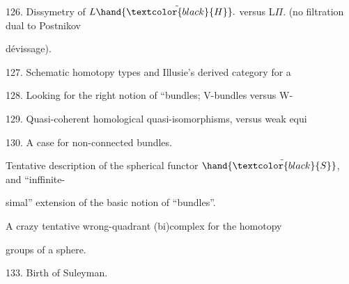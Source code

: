 126. Dissymetry of $L\hand{\tilde{\textcolor{black}{H}}}.$ versus L$\Pi$. (no filtration dual to Postnikov\par
dévissage).\par

127. Schematic homotopy types and Illusie's derived category for a \par

128. Looking for the right notion of ``bundles; V-bundles versus W-\par

129. Quasi-coherent homological quasi-isomorphisms, versus weak equi\par

130. A case for non-connected bundles.\par

\hand{\textcircled{\textcolor{black}{131.}}} Tentative description of the spherical functor $\hand{\tilde{\textcolor{black}{S}}}$, and ``inffinite-\par%
simal'' extension of the basic notion of ``bundles''.\par

\hand{\textcircled{\textcolor{black}{132.}}} A crazy\hand{,} tentative\hand{,} wrong-quadrant (bi)complex for the homotopy\par
groups of a sphere.\par
\margin{\hrulefill}\par

133. Birth of Suleyman.\par

